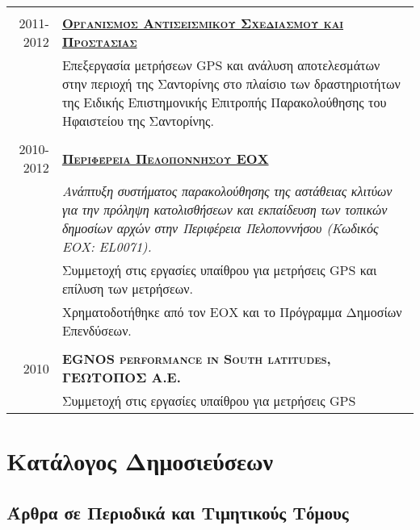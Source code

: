 \documentclass[a4paper,10pt]{article} %
\begin{document}
\begin{longtable}{r|p{13cm}}
\multicolumn{2}{c}{} \\
\textsc{2011-2012} & \textbf{\textsc{\href{http://www.oasp.gr/}{Οργανισμός Αντισεισμικού Σχεδιασμού και Προστασίας}}}\\
  & Επεξεργασία μετρήσεων GPS και ανάλυση αποτελεσμάτων στην περιοχή της Σαντορίνης στο πλαίσιο των δραστηριοτήτων της Ειδικής Επιστημονικής Επιτροπής Παρακολούθησης του Ηφαιστείου της Σαντορίνης.\\

\multicolumn{2}{c}{}\\
\textsc{2010-2012} & \textbf{\textsc{\href{http://www.landslides.gr/index.php?lang=el}{Περιφέρεια Πελοποννήσου ΕΟΧ}}}\\
  & \textit{Ανάπτυξη συστήματος παρακολούθησης της αστάθειας κλιτύων για την πρόληψη κατολισθήσεων και εκπαίδευση των τοπικών δημοσίων αρχών στην Περιφέρεια Πελοποννήσου (Κωδικός ΕΟΧ: EL0071).}\\
  & Συμμετοχή στις εργασίες υπαίθρου για μετρήσεις GPS και επίλυση των μετρήσεων.\\
  & Χρηματοδοτήθηκε από τον ΕΟΧ και το Πρόγραμμα Δημοσίων Επενδύσεων.\\

\multicolumn{2}{c}{}\\
\textsc{2010} & \textbf{\textsc{EGNOS performance in South latitudes, ΓΕΩΤΟΠΟΣ Α.Ε.}}\\
  & Συμμετοχή στις εργασίες υπαίθρου για μετρήσεις GPS\\

\end{longtable}
\medskip

\section{Κατάλογος Δημοσιεύσεων}
\medskip

\subsection*{Άρθρα σε Περιοδικά και Τιμητικούς Τόμους}
\end{document}
